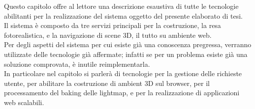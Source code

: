 Questo capitolo offre al lettore una descrizione esaustiva di tutte le tecnologie abilitanti per la realizzazione del sistema oggetto del presente elaborato di tesi. 
\\
Il sistema è composto da tre servizi principali per la costruzione, la resa fotorealistica, e la navigazione di scene 3D, il tutto su ambiente web.
\\
Per degli aspetti del sistema per cui esiste già una conoscenza pregressa, verranno utilizzate delle tecnologie già affermate; infatti se per un problema esiste già una soluzione comprovata, è inutile reimplementarla. 
\\
In particolare nel capitolo si parlerà di tecnologie per la gestione delle richieste utente, per abilitare la costruzione di ambient 3D sul browser, per il processamento del baking delle lightmap, e per la realizzazione di applicazioni web scalabili.
